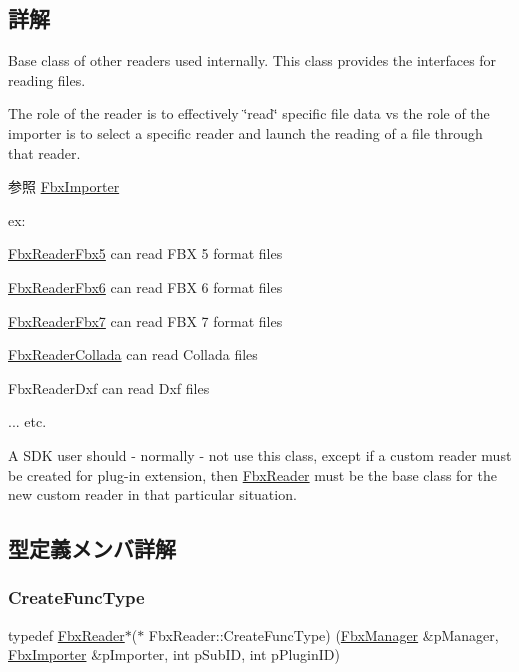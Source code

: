 \subsection{詳解}
Base class of other readers used internally. This class provides the interfaces for reading files.

The role of the reader is to effectively \char`\"{}read\char`\"{} specific file data vs the role of the importer is to select a specific reader and launch the reading of a file through that reader. \begin{DoxySeeAlso}{参照}
\hyperlink{class_fbx_importer}{Fbx\+Importer}
\end{DoxySeeAlso}
ex\+:
\begin{DoxyItemize}
\item \hyperlink{class_fbx_reader_fbx5}{Fbx\+Reader\+Fbx5} can read F\+BX 5 format files
\item \hyperlink{class_fbx_reader_fbx6}{Fbx\+Reader\+Fbx6} can read F\+BX 6 format files
\item \hyperlink{class_fbx_reader_fbx7}{Fbx\+Reader\+Fbx7} can read F\+BX 7 format files
\item \hyperlink{class_fbx_reader_collada}{Fbx\+Reader\+Collada} can read Collada files
\item Fbx\+Reader\+Dxf can read Dxf files
\item ... etc.
\end{DoxyItemize}

A S\+DK user should -\/ normally -\/ not use this class, except if a custom reader must be created for plug-\/in extension, then \hyperlink{class_fbx_reader}{Fbx\+Reader} must be the base class for the new custom reader in that particular situation. 

\subsection{型定義メンバ詳解}
\mbox{\label{class_fbx_reader_a83acaa910ced3876e5e232ff17f62c45}} 
\subsubsection{\texorpdfstring{Create\+Func\+Type}{CreateFuncType}}
{\footnotesize\ttfamily typedef \hyperlink{class_fbx_reader}{Fbx\+Reader}$\ast$($\ast$ Fbx\+Reader\+::\+Create\+Func\+Type) (\hyperlink{class_fbx_manager}{Fbx\+Manager} \&p\+Manager, \hyperlink{class_fbx_importer}{Fbx\+Importer} \&p\+Importer, int p\+Sub\+ID, int p\+Plugin\+ID)}

